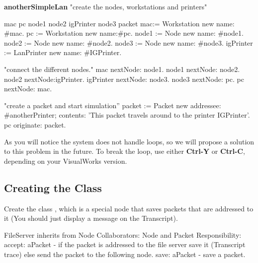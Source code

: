 \begin{scode}
\textbf{anotherSimpleLan}
   "create the nodes, workstations and printers"

   {\textbar}mac pc node1 node2 igPrinter node3 packet {\textbar}
   mac:= Workstation new name: \#mac.
   pc := Workstation new name:\#pc.
   node1 := Node new name: \#node1.
   node2 := Node new name: \#node2.
   node3 := Node new name: \#node3.
   igPrinter := LanPrinter new name: \#IGPrinter.

   "connect the different nodes." 
   mac nextNode: node1.
   node1 nextNode: node2.
   node2 nextNode:igPrinter.
   igPrinter nextNode: node3.
   node3 nextNode: pc.
   pc nextNode: mac.

   "create a packet and start simulation''
   packet := Packet new
             addressee: \#anotherPrinter;
             contents: 'This packet travels around
             to the printer IGPrinter'.
   pc originate: packet.
\end{scode}


As you will notice the system does not handle loops, so we will
propose a solution to this problem in the future. To break the
loop, use either \textbf{Ctrl-Y} or \textbf{Ctrl-C}, depending on your VisualWorks version.

\subsection*{Creating the Class }

Create the class , which is a special node that
saves packets that are addressed to it (You should just display a
message on the Transcript).


\begin{scode}
FileServer inherits from Node
Collaborators: Node and Packet
Responsibility:
accept: aPacket - if the packet is addressed to the
file server save it (Transcript trace) else send the
packet to the following node.
save: aPacket - save a packet.
\end{scode}

\ifx\wholebook\relax\else\fi
